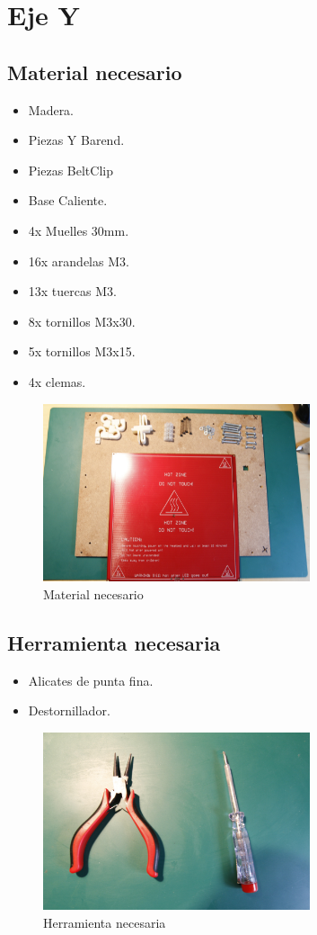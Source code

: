 \newpage{}
\section{Eje Y}
	\subsection{Material necesario}
		\begin{itemize}
			\item Madera.
			\item Piezas Y Barend.
			\item Piezas BeltClip
			\item Base Caliente.
			\item 4x Muelles 30mm.
			\item 16x arandelas M3.
			\item 13x tuercas M3.
			\item 8x tornillos M3x30.
			\item 5x tornillos M3x15.
			\item 4x clemas.
		\end{itemize}
		\begin{figure}[!htp]
			\centering
			\includegraphics[width=0.7\textwidth]{../../Fotos/33.jpg}
			\caption{Material necesario}
		\end{figure}
		\newpage{}
	\subsection{Herramienta necesaria}
		\begin{itemize}
			\item Alicates de punta fina.
			\item Destornillador.
		\end{itemize}
		\begin{figure}[!htp]
			\centering
			\includegraphics[width=0.7\textwidth]{../../Fotos/34.jpg}
			\caption{Herramienta necesaria}
		\end{figure}
		\newpage{}
